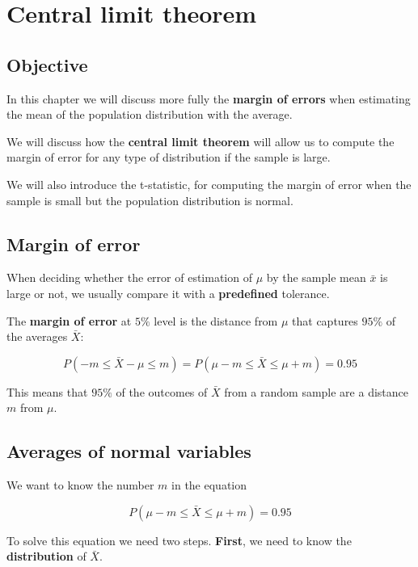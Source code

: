 \documentclass[
]{book}
\begin{document}
\hypertarget{central-limit-theorem}{%
\chapter{Central limit theorem}\label{central-limit-theorem}}

\hypertarget{objective-6}{%
\section{Objective}\label{objective-6}}

In this chapter we will discuss more fully the \textbf{margin of errors} when estimating the mean of the population distribution with the average.

We will discuss how the \textbf{central limit theorem} will allow us to compute the margin of error for any type of distribution if the sample is large.

We will also introduce the t-statistic, for computing the margin of error when the sample is small but the population distribution is normal.

\hypertarget{margin-of-error}{%
\section{Margin of error}\label{margin-of-error}}

When deciding whether the error of estimation of \(\mu\) by the sample mean \(\bar{x}\) is large or not, we usually compare it with a \textbf{predefined} tolerance.

The \textbf{margin of error} at \(5\%\) level is the distance from \(\mu\) that captures \(95\%\) of the averages \(\bar{X}\):

\[P(-m \leq \bar{X}-\mu \leq m)=P(\mu-m \leq \bar{X} \leq\mu + m)=0.95\]

This means that \(95\%\) of the outcomes of \(\bar{X}\) from a random sample are a distance \(m\) from \(\mu\).

\hypertarget{averages-of-normal-variables}{%
\section{Averages of normal variables}\label{averages-of-normal-variables}}

We want to know the number \(m\) in the equation

\[P(\mu-m \leq \bar{X} \leq\mu + m)=0.95\]

To solve this equation we need two steps. \textbf{First}, we need to know the \textbf{distribution} of \(\bar{X}\).
\end{document}
